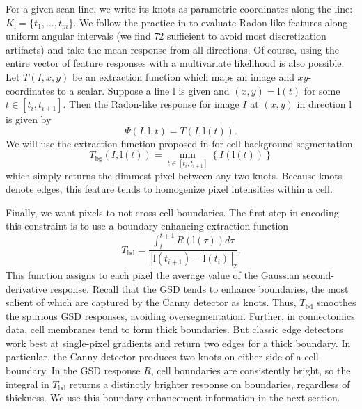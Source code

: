 \documentclass[english]{article}
\newcommand{\+}[1]{\ensuremath{\boldsymbol{\mathrm{#1}}}}
\begin{document}
For a given scan line, we write its knots as parametric coordinates along the line: $K_{\+l} = \{ t_1, \ldots, t_m \}$. We follow the practice in \cite{Kumar2010} to evaluate Radon-like features along uniform angular intervals (we find 72 sufficient to avoid most discretization artifacts) and take the mean response from all directions. Of course, using the entire vector of feature responses with a multivariate likelihood is also possible. Let $T(I, x, y)$ be an extraction function which maps an image and $xy$-coordinates to a scalar. Suppose a line $\+{l}$ is given and $(x, y) = \+{l}(t)$ for some $t \in [t_i, t_{i+1}]$. Then the Radon-like response for image $I$ at $(x, y)$ in direction $\+{l}$ is given by $$\Psi \left( I,\+{l},t \right) = T \left( I, \+{l}(t) \right).$$ We will use the extraction function proposed in \cite{Kumar2010} for cell background segmentation $$T_{\text{bg}}(I, \+{l}(t)) = \min_{t \in [t_i, t_{i+1}]} \left\{ I \left( \+{l}(t) \right) \right\}$$ which simply returns the dimmest pixel between any two knots. Because knots denote edges, this feature tends to homogenize pixel intensities within a cell.

Finally, we want pixels to not cross cell boundaries. The first step in encoding this constraint is to use a boundary-enhancing extraction function \cite{Kumar2010} $$T_{\text{bd}} = \frac{\int_t^{t+1} R\left( \+{l}(\tau) \right) d\tau }{\left\Vert \+{l}(t_{i+1}) - \+{l}(t_{i}) \right\Vert_2 }.$$ This function assigns to each pixel the average value of the Gaussian second-derivative response. Recall that the GSD tends to enhance boundaries, the most salient of which are captured by the Canny detector as knots. Thus, $T_{\text{bd}}$ smoothes the spurious GSD responses, avoiding oversegmentation. Further, in connectomics data, cell membranes tend to form thick boundaries. But classic edge detectors work best at single-pixel gradients and return two edges for a thick boundary. In particular, the Canny detector produces two knots on either side of a cell boundary. In the GSD response $R$, cell boundaries are consistently bright, so the integral in $T_{\text{bd}}$ returns a distinctly brighter response on boundaries, regardless of thickness. We use this boundary enhancement information in the next section.
\end{document}
